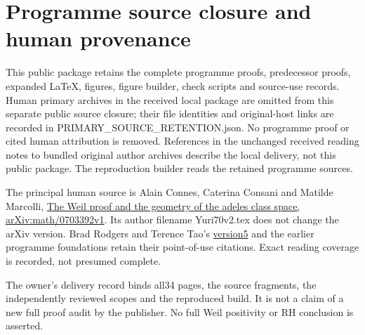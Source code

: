 \documentclass[
]{article}
\author{}
\date{}
\begin{document}
\section{Programme source closure and human
provenance}\label{programme-source-closure-and-human-provenance}

This public package retains the complete programme proofs, predecessor
proofs, expanded LaTeX, figures, figure builder, check scripts and
source-use records. Human primary archives in the received local package
are omitted from this separate public source closure; their file
identities and original-host links are recorded in
PRIMARY\_SOURCE\_RETENTION.json. No programme proof or cited human
attribution is removed. References in the unchanged received reading
notes to bundled original author archives describe the local delivery,
not this public package. The reproduction builder reads the retained
programme sources.

The principal human source is Alain Connes, Caterina Consani and Matilde
Marcolli, \href{https://arxiv.org/abs/math/0703392v1}{The Weil proof and
the geometry of the adeles class space, arXiv:math/0703392v1}. Its
author filename Yuri70v2.tex does not change the arXiv version. Brad
Rodgers and Terence Tao's
\href{https://arxiv.org/abs/1801.05914v5}{version5} and the earlier
programme foundations retain their point-of-use citations. Exact reading
coverage is recorded, not presumed complete.

The owner's delivery record binds all34 pages, the source fragments, the
independently reviewed scopes and the reproduced build. It is not a
claim of a new full proof audit by the publisher. No full Weil
positivity or RH conclusion is asserted.
\end{document}
